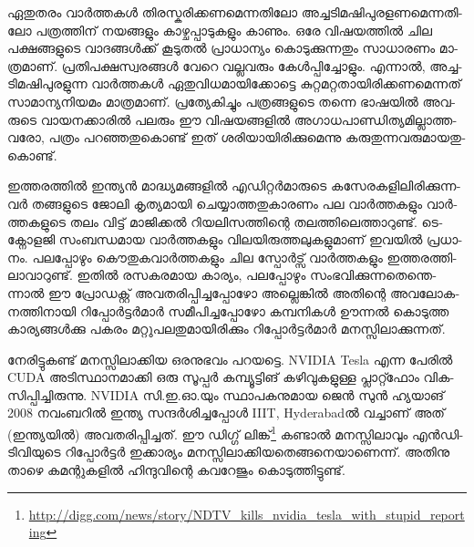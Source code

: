 ഏ­തു­ത­രം വാര്‍­ത്ത­കള്‍ തി­ര­സ്ക­രി­ക്ക­ണ­മെ­ന്ന­തി­ലോ അച്ച­ടി­മ­ഷി­പു­ര­ള­ണ­മെ­ന്ന­തി­ലോ പത്ര­ത്തി­ന് നയ­ങ്ങ­ളും 
കാ­ഴ്ച­പ്പാ­ടു­ക­ളും കാ­ണും. ഒരേ വി­ഷ­യ­ത്തില്‍ ചില പക്ഷ­ങ്ങ­ളു­ടെ വാ­ദ­ങ്ങള്‍­ക്ക് കൂ­ടു­തല്‍ പ്രാ­ധാ­ന്യം കൊ­ടു­ക്കു­ന്ന­തും 
സാ­ധാ­ര­ണം മാ­ത്ര­മാ­ണ്. പ്ര­തി­പ­ക്ഷ­സ്വ­ര­ങ്ങള്‍ വേ­റെ വല്ല­വ­രും കേള്‍­പ്പി­ച്ചോ­ളും. എന്നാല്‍, അച്ച­ടി­മ­ഷി­പു­ര­ളു­ന്ന 
വാര്‍­ത്ത­കള്‍ ഏതു­വി­ധ­മാ­യി­ക്കോ­ട്ടെ കു­റ്റ­മ­റ്റ­താ­യി­രി­ക്ക­ണ­മെ­ന്ന­ത് സാ­മാ­ന്യ­നി­യ­മം മാ­ത്ര­മാ­ണ്. പ്ര­ത്യേ­കി­ച്ചും 
പത്ര­ങ്ങ­ളു­ടെ തന്നെ ഭാ­ഷ­യില്‍ അവ­രു­ടെ വാ­യ­ന­ക്കാ­രില്‍ പല­രും ഈ വി­ഷ­യ­ങ്ങ­ളില്‍ 
അഗാ­ധ­പാ­ണ്ഡി­ത്യ­മി­ല്ലാ­ത്ത­വ­രോ, പത്രം പറ­ഞ്ഞ­തു­കൊ­ണ്ട് ഇത് ശരി­യാ­യി­രി­ക്കു­മെ­ന്നു കരു­തു­ന്ന­വ­രു­മാ­യ­തു­കൊ­ണ്ട്.

ഇ­ത്ത­ര­ത്തില്‍ ഇന്ത്യന്‍ മാ­ദ്ധ്യ­മ­ങ്ങ­ളില്‍ എഡി­റ്റര്‍­മാ­രു­ടെ കസേ­ര­ക­ളി­ലി­രി­ക്കു­ന്ന­വര്‍ തങ്ങ­ളു­ടെ ജോ­ലി കൃ­ത്യ­മാ­യി 
ചെ­യ്യാ­ത്ത­തു­കാ­ര­ണം പല വാര്‍­ത്ത­ക­ളും വാര്‍­ത്ത­ക­ളു­ടെ തലം വി­ട്ട് മാ­ജി­ക്കല്‍ റി­യ­ലി­സ­ത്തി­ന്റെ തല­ത്തി­ലെ­ത്താ­റു­ണ്ട്. 
ടെ­ക്നോ­ള­ജി സം­ബ­ന്ധ­മായ വാര്‍­ത്ത­ക­ളും വി­ല­യി­രു­ത്ത­ലു­ക­ളു­മാ­ണ് ഇവ­യില്‍ പ്ര­ധാ­നം. പല­പ്പോ­ഴും കൌ­തു­ക­വാര്‍­ത്ത­ക­ളും 
ചില സ്പോര്‍­ട്സ് വാര്‍­ത്ത­ക­ളും ഇത്ത­ര­ത്തി­ലാ­വാ­റു­ണ്ട്. ഇതില്‍ രസ­ക­ര­മായ കാ­ര്യം, പല­പ്പോ­ഴും 
സം­ഭ­വി­ക്കു­ന്ന­തെ­ന്തെ­ന്നാല്‍ ഈ പ്രോ­ഡ­ക്റ്റ് അവ­ത­രി­പ്പി­ച്ച­പ്പോ­ഴോ അല്ലെ­ങ്കില്‍ അതി­ന്റെ അവ­ലോ­ക­ന­ത്തി­നാ­യി 
റി­പ്പോര്‍­ട്ടര്‍­മാര്‍ സമീ­പി­ച്ച­പ്പോ­ഴോ കമ്പ­നി­കള്‍ ഊന്നല്‍ കൊ­ടു­ത്ത കാ­ര്യ­ങ്ങള്‍­ക്കു പക­രം മറ്റു­പ­ല­തു­മാ­യി­രി­ക്കും 
റി­പ്പോര്‍­ട്ടര്‍­മാര്‍ മന­സ്സി­ലാ­ക്കു­ന്ന­ത്.

­നേ­രി­ട്ടു­ക­ണ്ട് മന­സ്സി­ലാ­ക്കിയ ഒര­നു­ഭ­വം പറ­യ­ട്ടെ. NVIDIA Tesla എന്ന പേ­രില്‍ CUDA അടി­സ്ഥാ­ന­മാ­ക്കി ഒരു 
സൂ­പ്പര്‍ കമ്പ്യൂ­ട്ടി­ങ് കഴി­വു­ക­ളു­ള്ള പ്ലാ­റ്റ്ഫോം വി­ക­സി­പ്പി­ച്ചി­രു­ന്നു. NVIDIA സി­.ഇ­.ഓ.­യും സ്ഥാ­പ­ക­നു­മായ ജെന്‍ സുന്‍ 
ഹ്യ­യാ­ങ് 2008 നവം­ബ­റില്‍ ഇന്ത്യ സന്ദര്‍­ശി­ച്ച­പ്പോള്‍ IIIT, Hyderabadല്‍ വച്ചാ­ണ് അത് (ഇ­ന്ത്യ­യില്‍) 
അവ­ത­രി­പ്പി­ച്ച­ത്. ഈ ഡിഗ്ഗ് 
ലി­ങ്ക്\footnote{\url{http://digg.com/news/story/NDTV_kills_nvidia_tesla_with_stupid_reporting}}
കണ്ടാല്‍ മന­സ്സി­ലാ­വും എന്‍­ഡി­ടി­വി­യു­ടെ റി­പ്പോര്‍­ട്ടര്‍ ഇക്കാ­ര്യം 
മന­സ്സി­ലാ­ക്കി­യ­തെ­ങ്ങ­നെ­യാ­ണെ­ന്ന്. അതി­നു താ­ഴെ കമ­ന്റു­ക­ളില്‍ ഹി­ന്ദു­വി­ന്റെ കവ­റേ­ജും കൊ­ടു­ത്തി­ട്ടു­ണ്ട്.


